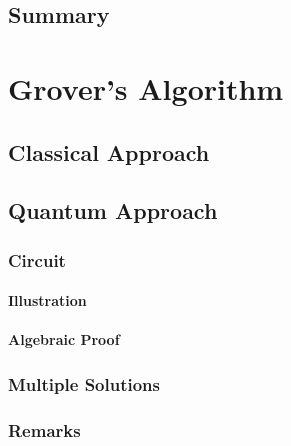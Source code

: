 		\subsection{Summary} %

	\section{Grover's Algorithm} %

		\subsection{Classical Approach} %

		\subsection{Quantum Approach} %

			\subsubsection{Circuit} %

				\paragraph{Illustration} %

				\paragraph{Algebraic Proof} %

			\subsubsection{Multiple Solutions} %

			\subsubsection{Remarks} %

